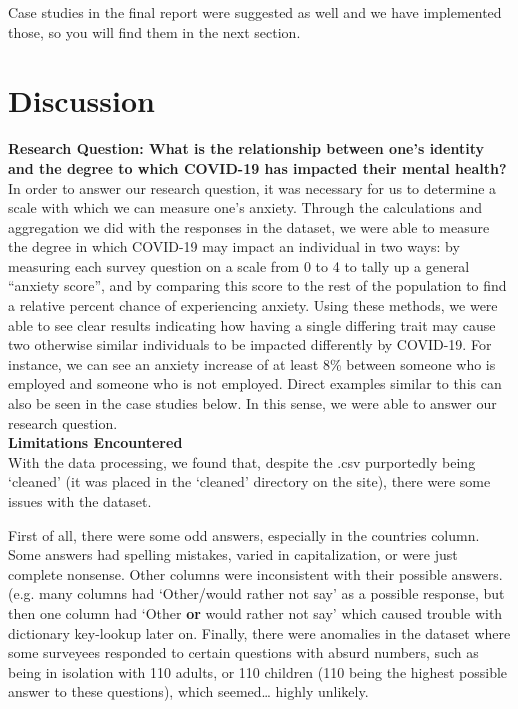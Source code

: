 \documentclass[fontsize=11pt]{article}
\begin{document}
    Case studies in the final report were suggested as well and we have implemented those, so you will find them in the next section.

	\section*{Discussion}
	\textbf{Research Question: What is the relationship between one’s identity and the degree to which COVID-19 has impacted their mental health?} \\
	In order to answer our research question, it was necessary for us to determine a scale with which we can measure one’s anxiety. Through the calculations and aggregation we did with the responses in the dataset, we were able to measure the degree in which COVID-19 may impact an individual in two ways: by measuring each survey question on a scale from 0 to 4 to tally up a general “anxiety score”, and by comparing this score to the rest of the population to find a relative percent chance of experiencing anxiety. Using these methods, we were able to see clear results indicating how having a single differing trait may cause two otherwise similar individuals to be impacted differently by COVID-19. For instance, we can see an anxiety increase of at least 8\% between someone who is employed and someone who is not employed.  Direct examples similar to this can also be seen in the case studies below. In this sense, we were able to answer our research question. \\

	\textbf{Limitations Encountered} \\
	With the data processing, we found that, despite the .csv purportedly being ‘cleaned’ (it was placed in the ‘cleaned’ directory on the site), there were some issues with the dataset.

	First of all, there were some odd answers, especially in the countries column. Some answers had spelling mistakes, varied in capitalization, or were just complete nonsense. Other columns were inconsistent with their possible answers. (e.g. many columns had ‘Other/would rather not say’ as a possible response, but then one column had ‘Other \textbf{or} would rather not say’ which caused trouble with dictionary key-lookup later on. Finally, there were anomalies in the dataset where some surveyees responded to certain questions with absurd numbers, such as being in isolation with 110 adults, or 110 children (110 being the highest possible answer to these questions), which seemed… highly unlikely.
\end{document}
